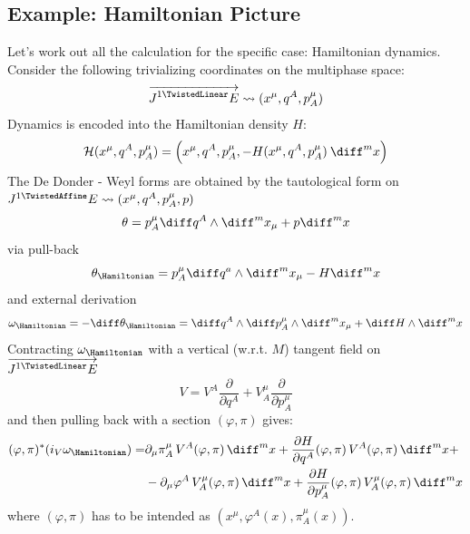 \documentclass[a4paper,12pt]{scrartcl}  %
\renewcommand{\AffDualJet}{ J^{1 \TwistedAffine}E }
\renewcommand{\LinDualJet}{ \overrightarrow{J^{1 \TwistedLinear}E} }
\begin{document}
\subsection{Example: Hamiltonian Picture}
Let's work out all the calculation for the specific case: Hamiltonian dynamics.\\
Consider the following trivializing coordinates on the multiphase space:
\begin{displaymath}
	\LinDualJet \rightsquigarrow (x^\mu, q^A, p^\mu_A)
\end{displaymath}
%
Dynamics is encoded into the Hamiltonian density $H$:
\begin{displaymath}
	\mathcal{H}(x^\mu, q^A, p^\mu_A) = 
	\left(x^\mu, q^A, p^\mu_A, - H( x^\mu, q^A, p^\mu_A) \: \diff^m x \right)
\end{displaymath}
%
The De Donder - Weyl forms are obtained by the tautological form on $\AffDualJet \rightsquigarrow (x^\mu, q^A, p^\mu_A, p)$
\begin{displaymath}
	\theta = p^\mu_A \diff q^A \wedge \diff^m x_\mu + p \diff^m x
\end{displaymath}
via pull-back
\begin{displaymath}
	\theta_\Hamiltonian = p^\mu_A \diff q^a \wedge \diff^m x_\mu - H \diff^m x
\end{displaymath}
and external derivation
\begin{displaymath}
	\omega_\Hamiltonian = -\diff \theta_\Hamiltonian = \diff q^A \wedge \diff p^\mu_A \wedge \diff^m x_\mu + \diff H \wedge \diff^m x 
\end{displaymath}
%
Contracting $\omega_\Hamiltonian$ with a vertical (w.r.t. $M$) tangent field on $\LinDualJet$
\begin{displaymath}
	V = V^A \dfrac{\partial}{\partial q^A} +
			V^\mu_A \dfrac{\partial}{\partial p^\mu_A}
\end{displaymath}
and then pulling back with a section $(\varphi,\pi)$ gives:
\begin{align*}
	(\varphi , \pi)^\ast (i_V \omega_\Hamiltonian ) = & 
	\partial_\mu \pi^\mu_A \, V^A(\varphi,\pi) \, \diff^m x 
	+ \frac{\partial H}{\partial q^A} (\varphi,\pi) \, V^A(\varphi,\pi) \, \diff^m x + \\
	 & - \partial_\mu \varphi^A \, V^\mu_A(\varphi,\pi) \, \diff^m x +
	\frac{\partial H}{\partial p^\mu_A} (\varphi,\pi) \, V^\mu_A(\varphi,\pi) \, \diff^m x
\end{align*}
where $(\varphi, \pi)$ has to be intended as $\left(x^\mu, \varphi^A(x), \pi^\mu_A(x)\right)$.
\end{document}
